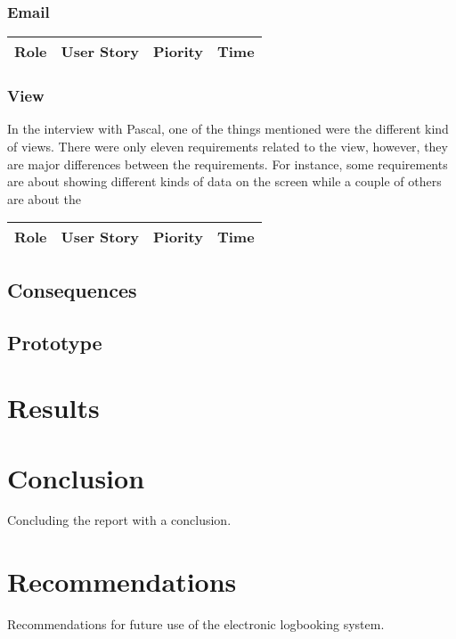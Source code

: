 \documentclass[paper=a4, fontsize=11pt,twoside]{scrartcl}	%
\begin{document}
\subsubsection{Email}

\begin{longtable}{ | p{2cm} | p{8cm} | p{1.5cm} | l |}
\hline
Role & User Story & Piority & Time \\ \hline
\end{longtable}

\subsubsection{View}
In the interview with Pascal, one of the things mentioned were the different kind of views. There were only eleven requirements related to the view, however, they are major differences between the requirements. For instance, some requirements are about showing different kinds of data on the screen while a couple of others are about the 

\begin{longtable}{ | p{2cm} | p{8cm} | p{1.5cm} | l |}
\hline
Role & User Story & Piority & Time \\ \hline
\end{longtable}




\subsection{Consequences}


\subsection{Prototype}

\newpage
\section{Results}


\newpage
\section{Conclusion}
Concluding the report with a conclusion.
\newpage
\section{Recommendations}
Recommendations for future use of the electronic logbooking system.
\newpage
\end{document}
